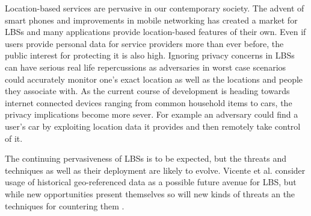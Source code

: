 \documentclass[english]{tktltiki2}
\theoremstyle{definition}
\theoremstyle{remark}
\begin{document}
Location-based services are pervasive in our contemporary society. The advent of smart phones and improvements in mobile networking has created a market for LBSs and many applications provide location-based features of their own. Even if users provide personal data for service providers more than ever before, the public interest for protecting it is also high. Ignoring privacy concerns in LBSs can have serious real life repercussions as adversaries in worst case scenarios could accurately monitor one's exact location as well as the locations and people they associate with. As the current course of development is heading towards internet connected devices ranging from common household items to cars, the privacy implications become more sever. For example an adversary could find a user's car by exploiting location data it provides and then remotely take control of it. \par
The continuing pervasiveness of LBSs is to be expected, but the threats and techniques as well as their deployment are likely to evolve. Vicente et al. consider usage of historical geo-referenced data as a possible future avenue for LBS, but while new opportunities present themselves so will new kinds of threats an the techniques for countering them \cite{LocationPrivacy}.

%
%
% 
%







% 
\end{document}
